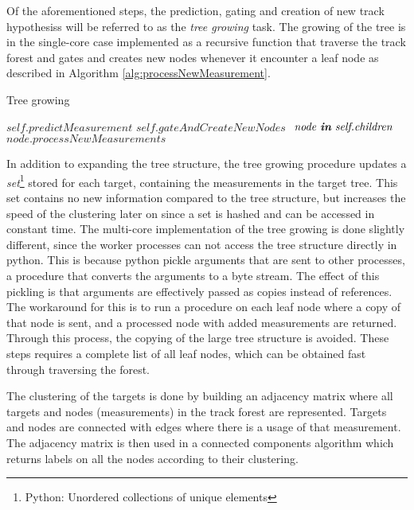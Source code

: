 Of the aforementioned steps, the prediction, gating and creation of new \glspl{track hypothesis} will be referred to as the \emph{tree growing} task. The growing of the tree is in the single-core case implemented as a recursive function that traverse the track forest and gates and creates new nodes whenever it encounter a leaf node as described in Algorithm \ref{alg:processNewMeasurement}.
\begin{algorithm}[H]
\caption{Tree growing}
\label{alg:processNewMeasurement}
\begin{algorithmic}[1]
	\State $\textit{self.predictMeasurement}$
	\State $\textit{self.gateAndCreateNewNodes}$
\Else
	\For $ \textit{ node \textbf{in} self.children} $
		\State $\textit{node.processNewMeasurements}$
	\EndFor
\EndIf
\EndProcedure
\end{algorithmic}
\end{algorithm}
In addition to expanding the tree structure, the tree growing procedure updates a \emph{set}\footnote{Python: Unordered collections of unique elements} stored for each target, containing the measurements in the target tree. This set contains no new information compared to the tree structure, but increases the speed of the clustering later on since a set is hashed and can be accessed in constant time. The multi-core implementation of the tree growing is done slightly different, since the worker processes can not access the tree structure directly in \gls{python}. This is because \gls{python} pickle arguments that are sent to other processes, a procedure that converts the arguments to a byte stream. The effect  of this pickling is that arguments are effectively passed as copies instead of references. The workaround for this is to run a procedure on each leaf node where a copy of that node is sent, and a processed node with added measurements are returned. Through this process, the copying of the large tree structure  is avoided. These steps requires a complete list of all leaf nodes, which can be obtained fast through traversing the forest.

The clustering of the targets is done by building an adjacency matrix where all targets and nodes (measurements) in the track forest are represented. Targets and nodes are connected with edges where there is a usage of that measurement. The adjacency matrix is then used in a connected components algorithm which returns labels on all the nodes according to their clustering.

